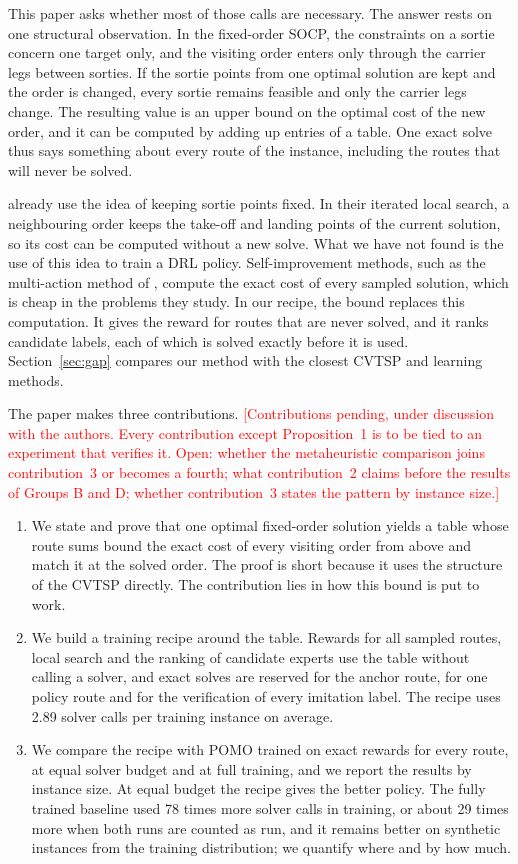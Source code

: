 \documentclass[preprint,12pt,authoryear]{elsarticle}
\newcommand{\placeholder}[1]{\textcolor{red}{[#1]}}
\begin{document}
This paper asks whether most of those calls are necessary. The answer rests on one structural observation. In the fixed-order SOCP, the constraints on a sortie concern one target only, and the visiting order enters only through the carrier legs between sorties. If the sortie points from one optimal solution are kept and the order is changed, every sortie remains feasible and only the carrier legs change. The resulting value is an upper bound on the optimal cost of the new order, and it can be computed by adding up entries of a table. One exact solve thus says something about every route of the instance, including the routes that will never be solved.

\citet{erdogan2021} already use the idea of keeping sortie points fixed. In their iterated local search, a neighbouring order keeps the take-off and landing points of the current solution, so its cost can be computed without a new solve. What we have not found is the use of this idea to train a DRL policy. Self-improvement methods, such as the multi-action method of \citet{luttmann2025}, compute the exact cost of every sampled solution, which is cheap in the problems they study. In our recipe, the bound replaces this computation. It gives the reward for routes that are never solved, and it ranks candidate labels, each of which is solved exactly before it is used. Section~\ref{sec:gap} compares our method with the closest CVTSP and learning methods.

The paper makes three contributions. \placeholder{Contributions pending, under discussion with the authors. Every contribution except Proposition~1 is to be tied to an experiment that verifies it. Open: whether the metaheuristic comparison joins contribution~3 or becomes a fourth; what contribution~2 claims before the results of Groups B and D; whether contribution~3 states the pattern by instance size.}
\begin{enumerate}
\item We state and prove that one optimal fixed-order solution yields a table whose route sums bound the exact cost of every visiting order from above and match it at the solved order. The proof is short because it uses the structure of the CVTSP directly. The contribution lies in how this bound is put to work.
\item We build a training recipe around the table. Rewards for all sampled routes, local search and the ranking of candidate experts use the table without calling a solver, and exact solves are reserved for the anchor route, for one policy route and for the verification of every imitation label. The recipe uses 2.89 solver calls per training instance on average.
\item We compare the recipe with POMO trained on exact rewards for every route, at equal solver budget and at full training, and we report the results by instance size. At equal budget the recipe gives the better policy. The fully trained baseline used 78 times more solver calls in training, or about 29 times more when both runs are counted as run, and it remains better on synthetic instances from the training distribution; we quantify where and by how much.
\end{enumerate}
\end{document}
